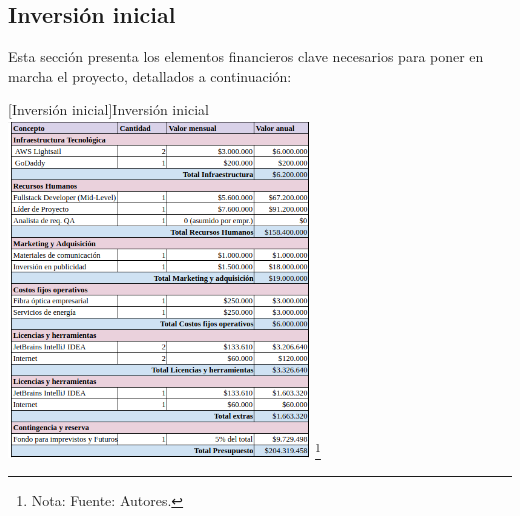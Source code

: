\subsection{Inversión inicial}

Esta sección presenta los elementos financieros clave necesarios para poner en marcha el proyecto, detallados a continuación:

\vspace{2mm}
\begin{minipage}{0.9\textwidth}
\centering
{}[Inversión inicial]{Inversión inicial}
\label{InversionInicial}
\includegraphics[width=0.6\textwidth]{Content/Images/AF/InversionInicial.png}
\footnote{Nota: \textup{Fuente: Autores.}}
\end{minipage}

